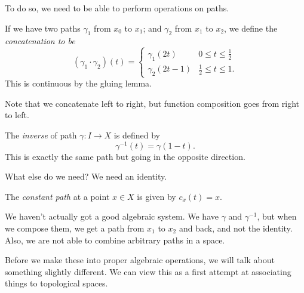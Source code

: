\documentclass[a4paper]{article}
\begin{document}
To do so, we need to be able to perform operations on paths.
\begin{defi}
  If we have two paths $\gamma_1$ from $x_0$ to $x_1$; and $\gamma_2$ from $x_1$ to $x_2$, we define the \emph{concatenation to be}
  \[
    (\gamma_1\cdot \gamma_2)(t) =
    \begin{cases}
      \gamma_1(2t) & 0 \leq t \leq \frac{1}{2}\\
      \gamma_2(2t - 1) & \frac{1}{2} \leq t \leq 1.
    \end{cases}
  \]
  This is continuous by the gluing lemma.
\end{defi}
Note that we concatenate left to right, but function composition goes from right to left.
\begin{center}
\end{center}
\begin{defi}
  The \emph{inverse} of path $\gamma: I \to X$ is defined by
  \[
    \gamma^{-1}(t) = \gamma(1 - t).
  \]
  This is exactly the same path but going in the opposite direction.
\end{defi}

What else do we need? We need an identity.
\begin{defi}
  The \emph{constant path} at a point $x\in X$ is given by $c_x(t) = x$.
\end{defi}

We haven't actually got a good algebraic system. We have $\gamma$ and $\gamma^{-1}$, but when we compose them, we get a path from $x_1$ to $x_2$ and back, and not the identity. Also, we are not able to combine arbitrary paths in a space.

Before we make these into proper algebraic operations, we will talk about something slightly different. We can view this as a first attempt at associating things to topological spaces.
\end{document}
